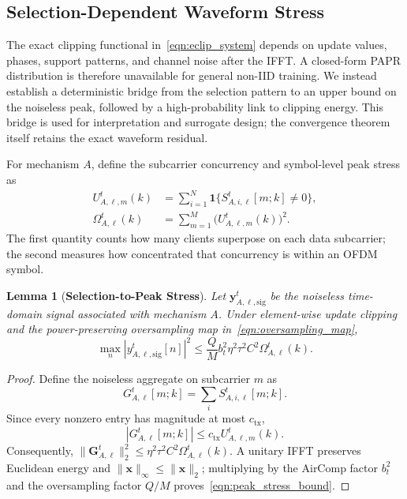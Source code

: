 \documentclass[journal]{IEEEtran}
\newenvironment{revisionblock}{\begingroup\color{revisionred}}{\endgroup}
\newtheorem{lemma}{Lemma}
\begin{document}
\begin{revisionblock}
\subsection{Selection-Dependent Waveform Stress}

The exact clipping functional in~\eqref{eqn:eclip_system} depends on update values, phases, support patterns, and channel noise after the IFFT. A closed-form PAPR distribution is therefore unavailable for general non-IID training. We instead establish a deterministic bridge from the selection pattern to an upper bound on the noiseless peak, followed by a high-probability link to clipping energy. This bridge is used for interpretation and surrogate design; the convergence theorem itself retains the exact waveform residual.

For mechanism $A$, define the subcarrier concurrency and symbol-level peak stress as
{
\begin{align}
	U_{A,\ell,m}^t(k)
	&=\sum_{i=1}^{N}
	\mathbf{1}\{S_{A,i,\ell}^t[m;k]\neq0\},\\
	\Omega_{A,\ell}^t(k)
	&=\sum_{m=1}^{M}\big(U_{A,\ell,m}^t(k)\big)^2.
	\label{eqn:omega_system}
\end{align}
}
The first quantity counts how many clients superpose on each data subcarrier; the second measures how concentrated that concurrency is within an OFDM symbol.

\begin{lemma}[\bf Selection-to-Peak Stress]
\label{lemma:peak_stress_main}
Let $\mathbf{y}_{A,\ell,\mathrm{sig}}^t$ be the noiseless time-domain signal associated with mechanism $A$. Under element-wise update clipping and the power-preserving oversampling map in~\eqref{eqn:oversampling_map},
{
\begin{equation}
	\max_n|y_{A,\ell,\mathrm{sig}}^t[n]|^2
	\le \frac{Q}{M}b_t^2\eta^2\tau^2C^2\Omega_{A,\ell}^t(k).
	\label{eqn:peak_stress_bound}
\end{equation}
}
\end{lemma}
\begin{proof}
Define the noiseless aggregate on subcarrier $m$ as
{
\begin{equation}
	G_{A,\ell}^t[m;k]=\sum_iS_{A,i,\ell}^t[m;k].
\end{equation}
}
Since every nonzero entry has magnitude at most $c_{\mathrm{tx}}$,
{
\begin{equation}
	|G_{A,\ell}^t[m;k]|
	\le c_{\mathrm{tx}} U_{A,\ell,m}^t(k).
\end{equation}
}
Consequently, $\|\mathbf{G}_{A,\ell}^t\|_2^2\le\eta^2\tau^2C^2\Omega_{A,\ell}^t(k)$. A unitary IFFT preserves Euclidean energy and $\|\mathbf{x}\|_\infty\le\|\mathbf{x}\|_2$; multiplying by the AirComp factor $b_t^2$ and the oversampling factor $Q/M$ proves~\eqref{eqn:peak_stress_bound}.
\end{proof}


\end{revisionblock}
\end{document}

